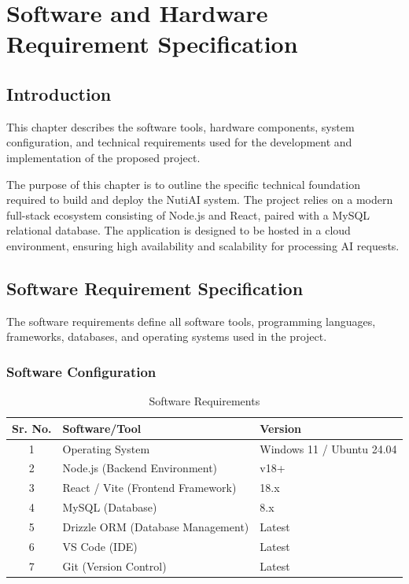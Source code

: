 \documentclass[12pt,a4paper]{report}
\begin{document}
\chapter{Software and Hardware Requirement Specification}

\section{Introduction}
This chapter describes the software tools, hardware components, system configuration, and technical requirements used for the development and implementation of the proposed project.

The purpose of this chapter is to outline the specific technical foundation required to build and deploy the NutiAI system. The project relies on a modern full-stack ecosystem consisting of Node.js and React, paired with a MySQL relational database. The application is designed to be hosted in a cloud environment, ensuring high availability and scalability for processing AI requests.

\section{Software Requirement Specification}
The software requirements define all software tools, programming languages, frameworks, databases, and operating systems used in the project.

\subsection{Software Configuration}

\begin{table}[H]
\centering
\begin{tabular}{|c|l|l|}
\hline
\textbf{Sr. No.} & \textbf{Software/Tool} & \textbf{Version} \\ \hline
1 & Operating System & Windows 11 / Ubuntu 24.04 \\ \hline
2 & Node.js (Backend Environment) & v18+ \\ \hline
3 & React / Vite (Frontend Framework) & 18.x \\ \hline
4 & MySQL (Database) & 8.x \\ \hline
5 & Drizzle ORM (Database Management) & Latest \\ \hline
6 & VS Code (IDE) & Latest \\ \hline
7 & Git (Version Control) & Latest \\ \hline
\end{tabular}
\caption{Software Requirements}
\end{table}
\end{document}
